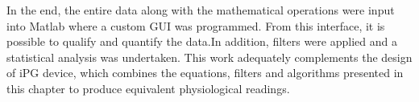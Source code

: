 In the end, the entire data along with the mathematical operations were input into Matlab where a custom GUI was programmed. From this interface, it is possible to qualify and quantify the data.In addition, filters were applied and a statistical analysis was undertaken. This work adequately complements the design of iPG device, which combines the equations, filters and algorithms presented in this chapter to produce equivalent physiological readings.



